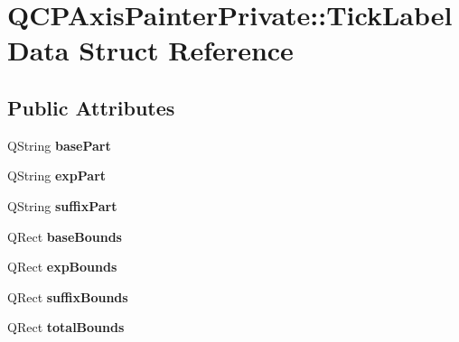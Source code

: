 \hypertarget{structQCPAxisPainterPrivate_1_1TickLabelData}{}\section{Q\+C\+P\+Axis\+Painter\+Private\+:\+:Tick\+Label\+Data Struct Reference}
\label{structQCPAxisPainterPrivate_1_1TickLabelData}
\subsection*{Public Attributes}
\begin{DoxyCompactItemize}
\item 
\mbox{\label{structQCPAxisPainterPrivate_1_1TickLabelData_ad65b76a5cafc412179a20b5d79809fc4}} 
Q\+String {\bfseries base\+Part}
\item 
\mbox{\label{structQCPAxisPainterPrivate_1_1TickLabelData_a09692e4ea092137278b4ac051d5fdf2b}} 
Q\+String {\bfseries exp\+Part}
\item 
\mbox{\label{structQCPAxisPainterPrivate_1_1TickLabelData_a3cbf21c6411730a318f8d2287b77d840}} 
Q\+String {\bfseries suffix\+Part}
\item 
\mbox{\label{structQCPAxisPainterPrivate_1_1TickLabelData_aac1047ae6ab8e9f5a42923082aabfff5}} 
Q\+Rect {\bfseries base\+Bounds}
\item 
\mbox{\label{structQCPAxisPainterPrivate_1_1TickLabelData_a6722d2bcefb93011e9dc42301b966846}} 
Q\+Rect {\bfseries exp\+Bounds}
\item 
\mbox{\label{structQCPAxisPainterPrivate_1_1TickLabelData_aa286a44422223bd4f0b044cc822079f6}} 
Q\+Rect {\bfseries suffix\+Bounds}
\item 
\mbox{\label{structQCPAxisPainterPrivate_1_1TickLabelData_afbb3163cf4c628914f1b703945419ea5}} 
Q\+Rect {\bfseries total\+Bounds}

\end{DoxyCompactItemize}
